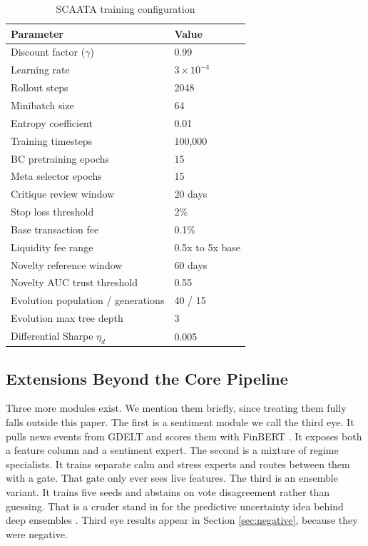 \documentclass[conference]{IEEEtran}
\begin{document}
\begin{table}[t]
\caption{SCAATA training configuration}
\label{tab:hyperparams}
\centering
\begin{tabular}{ll}
\toprule
Parameter & Value \\
\midrule
Discount factor ($\gamma$) & 0.99 \\
Learning rate & $3 \times 10^{-4}$ \\
Rollout steps & 2048 \\
Minibatch size & 64 \\
Entropy coefficient & 0.01 \\
Training timesteps & 100{,}000 \\
BC pretraining epochs & 15 \\
Meta selector epochs & 15 \\
Critique review window & 20 days \\
Stop loss threshold & 2\% \\
Base transaction fee & 0.1\% \\
Liquidity fee range & 0.5x to 5x base \\
Novelty reference window & 60 days \\
Novelty AUC trust threshold & 0.55 \\
Evolution population / generations & 40 / 15 \\
Evolution max tree depth & 3 \\
Differential Sharpe $\eta_d$ & 0.005 \\
\bottomrule
\end{tabular}
\end{table}

\subsection{Extensions Beyond the Core Pipeline}

Three more modules exist. We mention them briefly, since treating them fully falls outside this paper. The first is a sentiment module we call the third eye. It pulls news events from GDELT \cite{leetaru2013gdelt} and scores them with FinBERT \cite{araci2019finbert}. It exposes both a feature column and a sentiment expert. The second is a mixture of regime specialists. It trains separate calm and stress experts \cite{jacobs1991adaptive} and routes between them with a gate. That gate only ever sees live features. The third is an ensemble variant. It trains five seeds and abstains on vote disagreement rather than guessing. That is a cruder stand in for the predictive uncertainty idea behind deep ensembles \cite{lakshminarayanan2017simple}. Third eye results appear in Section \ref{sec:negative}, because they were negative.
\end{document}
